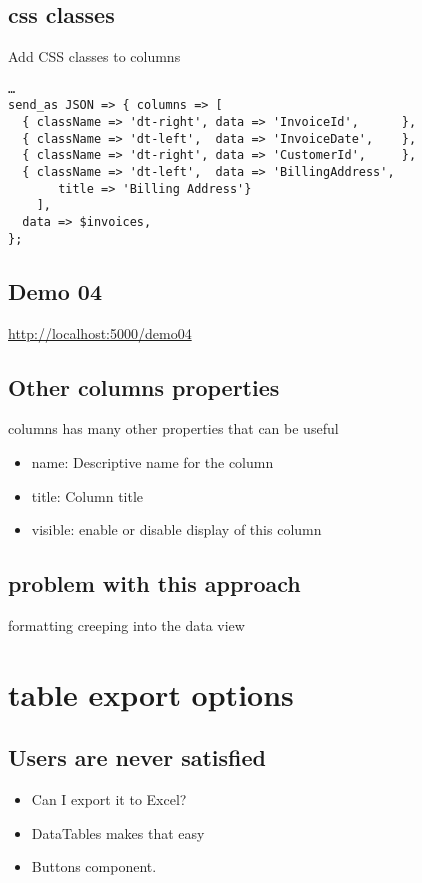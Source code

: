 \documentclass[11pt]{article}
\begin{document}
\subsection*{css classes}
\label{sec:orgheadline24}
Add CSS classes to columns
\begin{verbatim}
…
send_as JSON => { columns => [
  { className => 'dt-right', data => 'InvoiceId',      },
  { className => 'dt-left',  data => 'InvoiceDate',    },
  { className => 'dt-right', data => 'CustomerId',     },
  { className => 'dt-left',  data => 'BillingAddress',
       title => 'Billing Address'}
    ],
  data => $invoices,
};
\end{verbatim}
\subsection*{Demo 04}
\label{sec:orgheadline25}
\url{http://localhost:5000/demo04}
\subsection*{Other columns properties}
\label{sec:orgheadline26}
columns has many other properties that can be useful
\begin{itemize}
\item name: Descriptive name for the column
\item title: Column title
\item visible: enable or disable display of this column
\end{itemize}
\subsection*{problem with this approach}
\label{sec:orgheadline27}
formatting creeping into the data view
\section*{table export options}
\label{sec:orgheadline38}
\subsection*{Users are never satisfied}
\label{sec:orgheadline29}
\begin{itemize}
\item Can I export it to Excel?
\item DataTables makes that easy
\item Buttons component.
\end{itemize}
\end{document}
